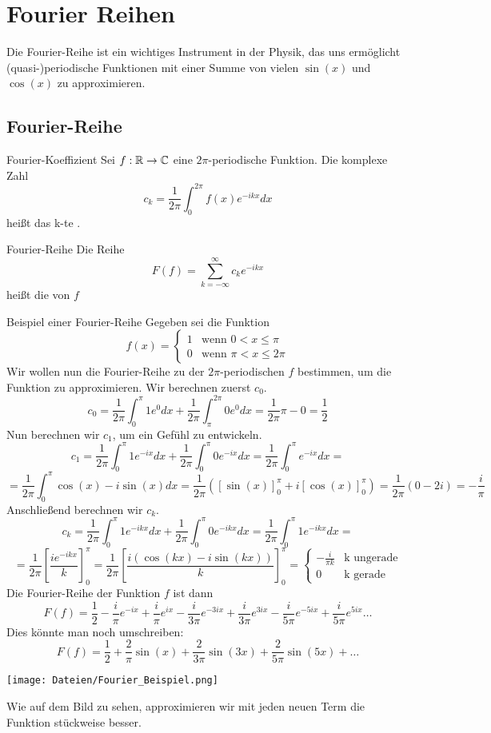 \newpage
\section[Fourier Reihen]{Fourier Reihen}
Die Fourier-Reihe ist ein wichtiges Instrument in der Physik, das uns ermöglicht (quasi-)periodische Funktionen mit einer Summe von vielen $\sin(x)$ und $\cos(x)$ zu approximieren.
\subsection{Fourier-Reihe}\label{ssec:Fourier}


\begin{Def}{Fourier-Koeffizient}
Sei $f:\mathbb{R} \rightarrow \mathbb{C}$ eine $2\pi$-periodische Funktion. Die komplexe Zahl
$$c_k=\frac{1}{2\pi}\int_0^{2\pi}f(x)e^{-ikx}dx$$
heißt das k-te .
\end{Def}
\begin{Def}{Fourier-Reihe}
Die Reihe $$F(f)=\sum_{k=-\infty}^\infty c_ke^{-ikx}$$ heißt die  von $f$
\end{Def}
\begin{Beispiel}{Beispiel einer Fourier-Reihe}
Gegeben sei die Funktion $$f(x)=\begin{cases}1 & \mbox{wenn $0< x\leq \pi$}\\
0 & \mbox{wenn $\pi< x\leq 2\pi$}
\end{cases}$$
Wir wollen nun die Fourier-Reihe zu der $2\pi$-periodischen $f$ bestimmen, um die Funktion zu approximieren. Wir berechnen zuerst $c_0$.
$$c_0=\frac{1}{2\pi}\int_0^\pi 1 e^{0} dx + \frac{1}{2\pi}\int_\pi^{2\pi} 0 e^{0} dx = \frac{1}{2\pi}\pi - 0 = \frac{1}{2}$$
Nun berechnen wir $c_1$, um ein Gefühl zu entwickeln.
$$c_1=\frac{1}{2\pi}\int_0^\pi 1 e^{-ix}dx + \frac{1}{2\pi}\int_0^\pi 0 e^{-ix}dx = \frac{1}{2\pi}\int_0^\pi  e^{-ix}dx = $$
$$=\frac{1}{2\pi} \int_0^\pi \cos(x) - i\sin(x) dx =\frac{1}{2\pi}([\sin(x)]^\pi_0+i[\cos(x)]^\pi_0)=\frac{1}{2\pi}(0-2i)=-\frac{i}{\pi}$$
Anschließend berechnen wir $c_k$.
$$c_k=\frac{1}{2\pi}\int_0^\pi 1 e^{-ikx}dx + \frac{1}{2\pi}\int_0^\pi 0 e^{-ikx}dx=\frac{1}{2\pi}\int_0^\pi 1 e^{-ikx}dx=$$
$$=\frac{1}{2\pi} [\frac{ie^{-ikx}}{k}]_0^{\pi}=\frac{1}{2\pi} [\frac{i(\cos(kx)-i\sin(kx))}{k}]_0^\pi=\begin{cases}-\frac{i}{\pi k} & \mbox{k ungerade}\\ 0 & \mbox{k gerade}\end{cases}$$
Die Fourier-Reihe der Funktion $f$ ist dann
$$F(f)=\frac{1}{2}-\frac{i}{\pi}e^{-ix}+\frac{i}{\pi}e^{ix}-\frac{i}{3\pi}e^{-3ix}+\frac{i}{3\pi}e^{3ix}-\frac{i}{5\pi}e^{-5ix}+\frac{i}{5\pi}e^{5ix}\dots$$
Dies könnte man noch umschreiben:
$$F(f)=\frac{1}{2}+\frac{2}{\pi}\sin(x)+\frac{2}{3\pi}\sin(3x)+\frac{2}{5\pi}\sin(5x)+\dots$$
\begin{center}
    \texttt{[image: Dateien/Fourier\_Beispiel.png]}
\end{center}
Wie auf dem Bild zu sehen, approximieren wir mit jeden neuen Term die Funktion stückweise besser.

\end{Beispiel}
